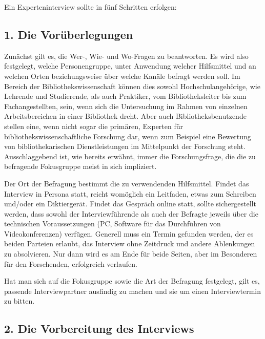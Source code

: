 \documentclass[a4paper,
fontsize=11pt,
oneside,
numbers=noperiodatend,
parskip=half-,
bibliography=totoc,
final
]{scrartcl}
\begin{document}
Ein Experteninterview sollte in fünf Schritten erfolgen:

\subsection{1. Die Vorüberlegungen}\label{die-voruxfcberlegungen}

Zunächst gilt es, die Wer-, Wie- und Wo-Fragen zu beantworten. Es wird
also festgelegt, welche Personengruppe, unter Anwendung welcher
Hilfsmittel und an welchen Orten beziehungsweise über welche Kanäle
befragt werden soll. Im Bereich der Bibliothekswissenschaft können dies
sowohl Hochschulangehörige, wie Lehrende und Studierende, als auch
Praktiker, vom Bibliotheksleiter bis zum Fachangestellten, sein, wenn
sich die Untersuchung im Rahmen von einzelnen Arbeitsbereichen in einer
Bibliothek dreht. Aber auch Bibliotheksbenutzende stellen eine, wenn
nicht sogar die primären, Experten für bibliothekswissenschaftliche
Forschung dar, wenn zum Beispiel eine Bewertung von bibliothekarischen
Dienstleistungen im Mittelpunkt der Forschung steht. Ausschlaggebend
ist, wie bereits erwähnt, immer die Forschungsfrage, die die zu
befragende Fokusgruppe meist in sich impliziert.

Der Ort der Befragung bestimmt die zu verwendenden Hilfsmittel. Findet
das Interview in Persona statt, reicht womöglich ein Leitfaden, etwas
zum Schreiben und/oder ein Diktiergerät. Findet das Gespräch online
statt, sollte sichergestellt werden, dass sowohl der Interviewführende
als auch der Befragte jeweils über die technischen Voraussetzungen (PC,
Software für das Durchführen von Videokonferenzen) verfügen. Generell
muss ein Termin gefunden werden, der es beiden Parteien erlaubt, das
Interview ohne Zeitdruck und andere Ablenkungen zu absolvieren. Nur dann
wird es am Ende für beide Seiten, aber im Besonderen für den
Forschenden, erfolgreich verlaufen.

Hat man sich auf die Fokusgruppe sowie die Art der Befragung festgelegt,
gilt es, passende Interviewpartner ausfindig zu machen und sie um einen
Interviewtermin zu bitten.

\subsection{2. Die Vorbereitung des
Interviews}\label{die-vorbereitung-des-interviews}
\end{document}
